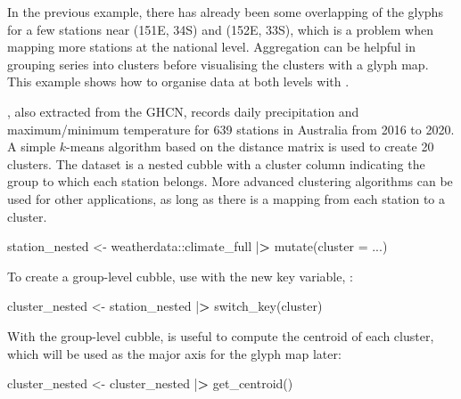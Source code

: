 \documentclass{article}
\newenvironment{Shaded}{\begin{snugshade}}{\end{snugshade}}
\newcommand{\AttributeTok}[1]{\textcolor[rgb]{0.77,0.63,0.00}{#1}}
\newcommand{\ErrorTok}[1]{\textcolor[rgb]{0.64,0.00,0.00}{\textbf{#1}}}
\newcommand{\FunctionTok}[1]{\textcolor[rgb]{0.00,0.00,0.00}{#1}}
\newcommand{\NormalTok}[1]{#1}
\newcommand{\OtherTok}[1]{\textcolor[rgb]{0.56,0.35,0.01}{#1}}
\newcommand{\SpecialCharTok}[1]{\textcolor[rgb]{0.00,0.00,0.00}{#1}}
\begin{document}
In the previous example, there has already been some overlapping of the glyphs for a few stations near (151E, 34S) and (152E, 33S), which is a problem when mapping more stations at the national level. Aggregation can be helpful in grouping series into clusters before visualising the clusters with a glyph map. This example shows how to organise data at both levels with .

, also extracted from the GHCN, records daily precipitation and maximum/minimum temperature for 639 stations in Australia from 2016 to 2020. A simple \(k\)-means algorithm based on the distance matrix is used to create 20 clusters. The dataset  is a nested cubble with a cluster column indicating the group to which each station belongs. More advanced clustering algorithms can be used for other applications, as long as there is a mapping from each station to a cluster.

\begin{Shaded}
\begin{Highlighting}[]
\NormalTok{station\_nested }\OtherTok{\textless{}{-}}\NormalTok{ weatherdata}\SpecialCharTok{::}\NormalTok{climate\_full }\SpecialCharTok{|}\ErrorTok{\textgreater{}}
  \FunctionTok{mutate}\NormalTok{(}\AttributeTok{cluster =}\NormalTok{ ...)}
\end{Highlighting}
\end{Shaded}

To create a group-level cubble, use  with the new key variable, :

\begin{Shaded}
\begin{Highlighting}[]
\NormalTok{cluster\_nested }\OtherTok{\textless{}{-}}\NormalTok{ station\_nested }\SpecialCharTok{|}\ErrorTok{\textgreater{}} \FunctionTok{switch\_key}\NormalTok{(cluster)}
\end{Highlighting}
\end{Shaded}

With the group-level cubble,  is useful to compute the centroid of each cluster, which will be used as the major axis for the glyph map later:

\begin{Shaded}
\begin{Highlighting}[]
\NormalTok{cluster\_nested }\OtherTok{\textless{}{-}}\NormalTok{ cluster\_nested }\SpecialCharTok{|}\ErrorTok{\textgreater{}} \FunctionTok{get\_centroid}\NormalTok{()}
\end{Highlighting}
\end{Shaded}
\end{document}
